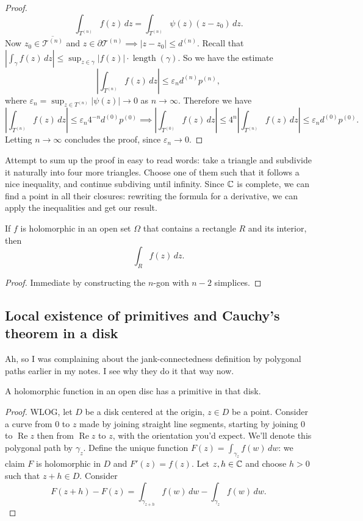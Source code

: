 \begin{proof}
\[\int_{T^{(n)}}^{} f(z) \, dz = \int_{T^{(n)}}^{} \psi(z)(z-z_0) \, dz.
\] Now $z_0\in \overline{\mathcal{T} ^{(n)}}$ and $z\in \partial \mathcal{T} ^{(n)}\implies |z-z_0|\leq d^{(n)}$. Recall that $\left| \int_{\gamma}^{} f(z) \, dz \right| \leq \sup_{z\in \gamma}|f(z)|\cdot \operatorname{length}(\gamma)$. So we have the estimate \[
\left| \int_{T^{(n)}}^{} f(z) \, dz \right| \leq \varepsilon _n d^{(n)}p^{(n)},
\] where $\varepsilon _n =\sup_{z\in T^{(n)}}|\psi(z)|\to 0$ as $n\to \infty$. Therefore we have \[
\left| \int_{T^{(n)}}^{} f(z) \, dz \right| \leq\varepsilon _n 4^{-n}d^{(0)}p^{(0)}
\implies \left| \int_{T^{(0)}}^{} f(z) \, dz \right| \leq 4^n  \left| \int_{T^{(n)}}^{} f(z) \, dz \right| \leq \varepsilon _n d^{(0)}p^{(0)}.
\] Letting $n\to \infty$ concludes the proof, since $\varepsilon _n \to 0$.
\end{proof}
Attempt to sum up the proof in easy to read words: take a triangle and subdivide it naturally into four more triangles. Choose one of them such that it follows a nice inequality, and continue subdiving until infinity. Since $\mathbb{C}$ is complete, we can find a point in all their closures: rewriting the formula for a derivative, we can apply the inequalities and get our result.
\begin{cor}
    If $f$ is holomorphic in an open set $\Omega$ that contains a rectangle $R$ and its interior, then \[
        \int_{R}^{} f(z) \, dz.
    \] 
\end{cor}
\begin{proof}
    Immediate by constructing the $n$-gon with $n-2$ simplices.
\end{proof}

\subsection{Local existence of primitives and Cauchy's theorem in a disk}
Ah, so I was complaining about the jank-connectedness definition by polygonal paths earlier in my notes. I see why they do it that way now.
\begin{theorem}
    A holomorphic function in an open disc has a primitive in that disk.
\end{theorem}
\begin{proof}
    WLOG, let $D$ be a disk centered at the origin, $z\in D$ be a point. Consider a curve from $0$ to $z$ made by joining straight line segments, starting by joining $0$ to $\operatorname{Re}z$ then from $\operatorname{Re}z$ to $z$, with the orientation you'd expect. We'll denote this polygonal path by $\gamma_z$. Define the unique function $F(z)=\int_{\gamma_z}^{} f(w) \, dw$: we claim $F$ is holomorphic in $D$ and $F'(z)=f(z)$. Let $z,h\in \mathbb{C}$ and choose $h>0$ such that $z+h\in D$. Consider \[
        F(z+h)-F(z)=\int_{\gamma_{z+h}}^{} f(w) \, dw-\int_{\gamma_z}^{} f(w) \, dw.
    \] 
\end{proof}





